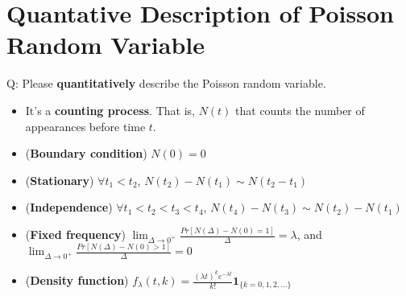 \documentclass[../Probability_Theory.tex]{subfiles}
\begin{document}
\section{Quantative Description of Poisson Random Variable}
Q: Please {\bf quantitatively} describe the Poisson random variable.
\begin{itemize}
	\item It's a {\bf counting process}. That is, $N(t)$ that counts the number of appearances before time $t$.
	\item ({\bf Boundary condition}) $N(0)=0$
	\item ({\bf Stationary}) $\forall t_1<t_2$, $N(t_2)-N(t_1)\sim N(t_2-t_1)$
	\item ({\bf Independence}) $\forall t_1<t_2<t_3<t_4$, $N(t_4)-N(t_3)\sim N(t_2)-N(t_1)$
	\item ({\bf Fixed frequency}) $\lim_{\Delta\rightarrow0^+} \frac{Pr[N(\Delta)-N(0) = 1]}{\Delta}=\lambda$, and $\lim_{\Delta\rightarrow0^+} \frac{Pr[N(\Delta)-N(0) > 1]}{\Delta}=0$
	\item ({\bf Density function}) $f_{\lambda}(t,k) = \frac{(\lambda t)^{k}e^{-\lambda t}}{k!}\mathbf{1}_{\{k=0,1,2,...\}}$
\end{itemize}
\end{document}
